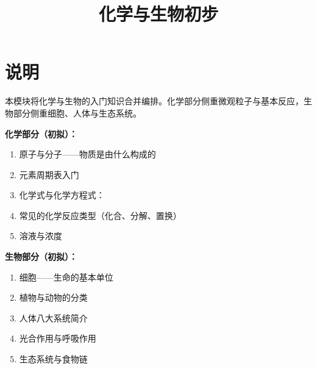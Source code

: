 \documentclass[a4paper,12pt]{ctexart}
\title{\textcolor{blue!70!black}{\Huge\textbf{化学与生物初步}}}
\author{}
\date{}
\begin{document}
\maketitle
\thispagestyle{empty}

\section*{\textcolor{blue!70!black}{说明}}

本模块将化学与生物的入门知识合并编排。化学部分侧重微观粒子与基本反应，生物部分侧重细胞、人体与生态系统。

\vspace{0.3cm}

\textbf{化学部分（初拟）：}
\begin{enumerate}
  \item 原子与分子——物质是由什么构成的
  \item 元素周期表入门
  \item 化学式与化学方程式：
  \item 常见的化学反应类型（化合、分解、置换）
  \item 溶液与浓度
\end{enumerate}

\vspace{0.3cm}

\textbf{生物部分（初拟）：}
\begin{enumerate}
  \item 细胞——生命的基本单位
  \item 植物与动物的分类
  \item 人体八大系统简介
  \item 光合作用与呼吸作用
  \item 生态系统与食物链
\end{enumerate}
\end{document}
